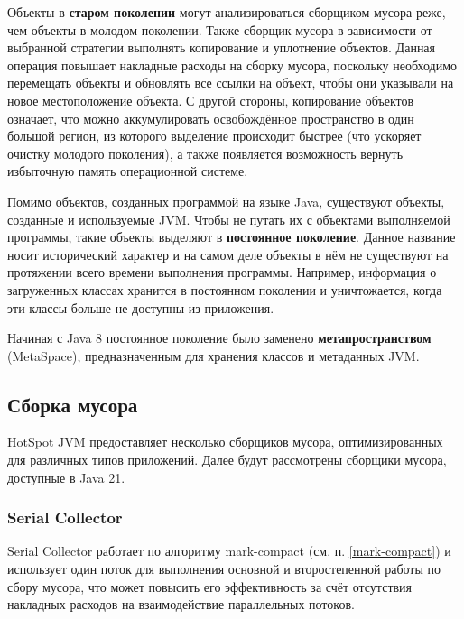 Объекты в \textbf{старом поколении} могут анализироваться сборщиком мусора реже, чем объекты в молодом поколении. Также сборщик мусора в зависимости от выбранной стратегии выполнять копирование и уплотнение объектов. Данная операция повышает накладные расходы на сборку мусора, поскольку необходимо перемещать объекты и обновлять все ссылки на объект, чтобы они указывали на новое местоположение объекта. С другой стороны, копирование объектов означает, что можно аккумулировать освобождённое пространство в один большой регион, из которого выделение происходит быстрее (что ускоряет очистку молодого поколения), а также появляется возможность вернуть избыточную память операционной системе. \cite{java_storage_management} \cite{java_memory}

Помимо объектов, созданных программой на языке Java, существуют объекты, созданные и используемые JVM. Чтобы не путать их с объектами выполняемой программы, такие объекты выделяют в \textbf{постоянное поколение}. Данное название носит исторический характер и на самом деле объекты в нём не существуют на протяжении всего времени выполнения программы. Например, информация о загруженных классах хранится в постоянном поколении и уничтожается, когда эти классы больше не доступны из приложения. \cite{java_storage_management}

Начиная с Java 8 постоянное поколение было заменено \textbf{метапространством} (MetaSpace), предназначенным для хранения классов и метаданных JVM.~\cite{java_presentation}



\subsection{Сборка мусора}

HotSpot JVM предоставляет несколько сборщиков мусора, оптимизированных для различных типов приложений. Далее будут рассмотрены сборщики мусора, доступные в Java 21. \cite{java_21_available_collectors}



\subsubsection{Serial Collector}
Serial Collector работает по алгоритму mark-compact (см. п. \ref{mark-compact}) и использует один поток для выполнения основной и второстепенной работы по сбору мусора, что может повысить его эффективность за счёт отсутствия накладных расходов на взаимодействие параллельных потоков. \cite{java_21_available_collectors}

